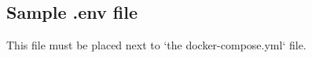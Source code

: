 \documentclass{article}
\newcommand{\namedlisting}[2][]{%
}
\newcommand*\lstinputpath[1]{\lstset{inputpath=#1}}
\begin{document}
\subsection{Sample .env file}
This file must be placed next to `the docker-compose.yml` file.

\lstinputpath{../webshop-distributed/sample.env/}
\namedlisting[]{.env}
% 
% 
% 
% 
% 
% 
% 
% 
% 
% 
% 
% 
% 
% 
% 
% 
\end{document}
